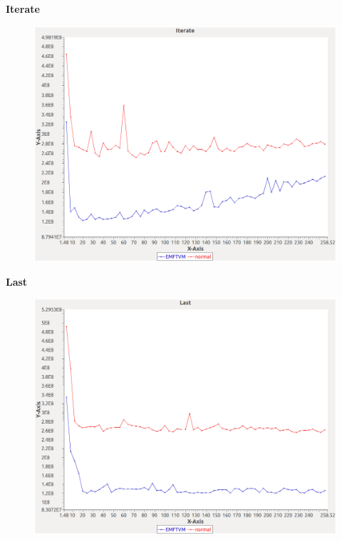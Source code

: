 \noindent\textbf{Iterate}

\begin{figure}[h]
\centering
\includegraphics[width=\textwidth]{graphs/orderedset/Iterate}
\end{figure}
\pagebreak

\noindent\textbf{Last}

\begin{figure}[h]
\centering
\includegraphics[width=\textwidth]{graphs/orderedset/Last}
\end{figure}
\pagebreak

